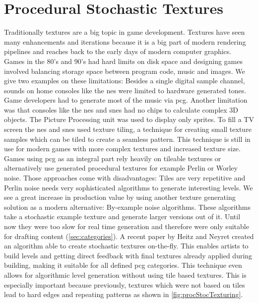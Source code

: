\documentclass[10pt,a4paper]{article}
\begin{document}
\section{Procedural Stochastic Textures}\label{sec:pcTexture}
\begin{multicols}{2}
Traditionally textures are a big topic in game development. Textures have seen many enhancements and iterations because it is a big part of modern rendering pipelines and reaches back to the early days of modern computer graphics. Games in the 80’s and 90’s had hard limits on disk space\cite{Ferrari2016} and designing games involved balancing storage space between program code, music and images. We give two examples on these limitations: Besides a single digital sample channel, sounds on home consoles like the \gls{nes} were limited to hardware generated tones\cite{wiki:NintendoEntertainmentSystem}. Game developers had to generate most of the music via \gls{pcg}. Another limitation was that consoles like the \gls{nes} and \gls{snes} had no chips to calculate complex 3D objects. The Picture Processing unit was used to display only sprites. To fill a TV screen the \gls{nes} and \gls{snes} used texture tiling, a technique for creating small texture samples which can be tiled to create a seamless pattern. This technique is still in use for modern games with more complex textures and increased texture size. Games using \gls{pcg} as an integral part rely heavily on tileable textures or alternatively use generated procedural textures for example Perlin\cite{perlin1985image} or Worley\cite{worley1996cellular} noise. Those approaches come with disadvantages: Tiles are very repetitive and Perlin noise needs very sophisticated algorithms to generate interesting levels. We see a great increase in production value by using another texture generating solution as a modern alternative: By-example noise algorithms. These algorithms take a stochastic example texture and generate larger versions out of it. Until now they were too slow for real time generation and therefore were only suitable for drafting content (\autoref{sec:categories}). A recent paper by Heitz and Neyret created an algorithm able to create stochastic textures on-the-fly\cite{Heitz2018}. This enables artists to build levels and getting direct feedback with final textures already applied during building, making it suitable for all defined \gls{pcg} categories. This technique even allows for algorithmic level generation without using tile based textures. This is especially important because previously, textures which were not based on tiles lead to hard edges and repeating patterns as shown in \autoref{fig:procStocTexturing}.
\end{multicols}
\end{document}
